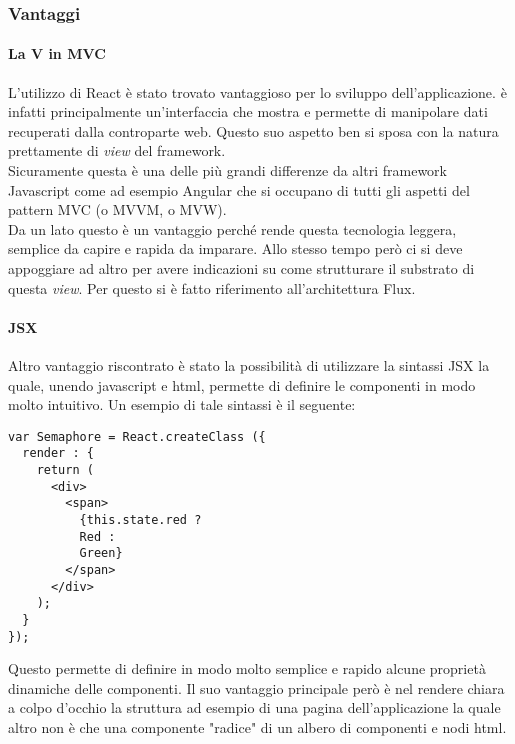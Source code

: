 \subsubsection{Vantaggi}

\paragraph{La V in MVC}\label{just-the-view}
L'utilizzo di React è stato trovato vantaggioso per lo sviluppo dell'applicazione.
\fiscoloMobile{} è infatti principalmente un'interfaccia che mostra e permette di
manipolare dati recuperati dalla controparte web. Questo suo aspetto ben si sposa
con la natura prettamente di \textit{view} del framework. \\

Sicuramente questa è una delle più grandi differenze da altri framework Javascript
come ad esempio Angular che si occupano di tutti gli aspetti del pattern MVC 
(o MVVM, o MVW). \\

Da un lato questo è un vantaggio perché rende questa tecnologia leggera, semplice da
capire e rapida da imparare. Allo stesso tempo però ci si deve appoggiare ad altro
per avere indicazioni su come strutturare il substrato di questa \textit{view}. Per
questo si è fatto riferimento all'architettura Flux. \\

\paragraph{JSX}
Altro vantaggio riscontrato è stato la possibilità di utilizzare la sintassi JSX
la quale, unendo javascript e html, permette di definire le componenti in modo molto
intuitivo. Un esempio di tale sintassi è il seguente:

\begin{verbatim}
var Semaphore = React.createClass ({
  render : {
    return (
      <div>
        <span>
          {this.state.red ?
          Red :
          Green}
        </span>
      </div>	
    );
  }
});
\end{verbatim}

Questo permette di definire in modo molto semplice e rapido alcune proprietà dinamiche
delle componenti. Il suo vantaggio principale però è nel rendere chiara a colpo d'occhio
la struttura ad esempio di una pagina dell'applicazione la quale altro non è che una
componente "radice" di un albero di componenti e nodi html.

